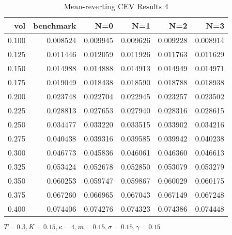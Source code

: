 \begin{table}[ht]
\centering
\caption{Mean-reverting CEV Results 4}
\begin{tabular}{rrrrrr}
\toprule
  vol &       benchmark &       N=0 &       N=1 &       N=2 &       N=3 \\
\midrule
0.100 & 0.008524 & 0.009945 & 0.009626 & 0.009228 & 0.008914 \\
0.125 & 0.011446 & 0.012059 & 0.011926 & 0.011763 & 0.011629 \\
0.150 & 0.014988 & 0.014888 & 0.014913 & 0.014949 & 0.014971 \\
0.175 & 0.019049 & 0.018438 & 0.018590 & 0.018788 & 0.018938 \\
0.200 & 0.023748 & 0.022704 & 0.022945 & 0.023257 & 0.023502 \\
0.225 & 0.028813 & 0.027653 & 0.027940 & 0.028316 & 0.028615 \\
0.250 & 0.034477 & 0.033220 & 0.033515 & 0.033902 & 0.034216 \\
0.275 & 0.040438 & 0.039316 & 0.039585 & 0.039942 & 0.040238 \\
0.300 & 0.046773 & 0.045836 & 0.046061 & 0.046360 & 0.046613 \\
0.325 & 0.053424 & 0.052678 & 0.052850 & 0.053079 & 0.053279 \\
0.350 & 0.060253 & 0.059747 & 0.059867 & 0.060029 & 0.060175 \\
0.375 & 0.067260 & 0.066965 & 0.067043 & 0.067149 & 0.067248 \\
0.400 & 0.074406 & 0.074276 & 0.074323 & 0.074386 & 0.074448 \\
\bottomrule
\end{tabular}
\small{$T=0.3,K=0.15, \kappa = 4,m=0.15, \sigma = 0.15, \gamma = 0.15$}
\end{table}

